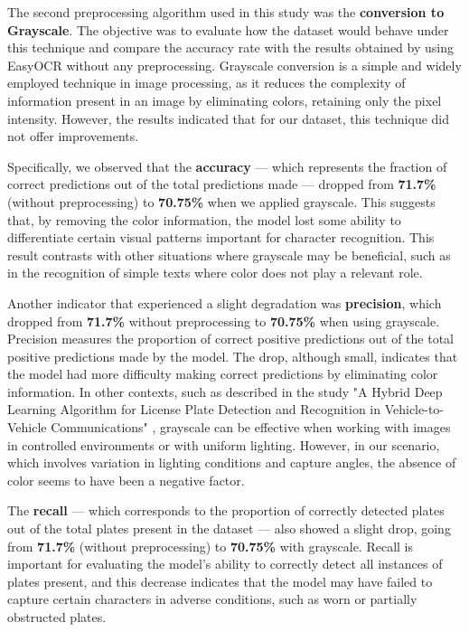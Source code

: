 \documentclass[conference]{IEEEtran}
\begin{document}
	The second preprocessing algorithm used in this study was the \textbf{conversion to Grayscale}. The objective was to evaluate how the dataset would behave under this technique and compare the accuracy rate with the results obtained by using EasyOCR without any preprocessing. Grayscale conversion is a simple and widely employed technique in image processing, as it reduces the complexity of information present in an image by eliminating colors, retaining only the pixel intensity. However, the results indicated that for our dataset, this technique did not offer improvements.
	
	Specifically, we observed that the \textbf{accuracy} — which represents the fraction of correct predictions out of the total predictions made — dropped from \textbf{71.7\%} (without preprocessing) to \textbf{70.75\%} when we applied grayscale. This suggests that, by removing the color information, the model lost some ability to differentiate certain visual patterns important for character recognition. This result contrasts with other situations where grayscale may be beneficial, such as in the recognition of simple texts where color does not play a relevant role.
	
	Another indicator that experienced a slight degradation was \textbf{precision}, which dropped from \textbf{71.7\%} without preprocessing to \textbf{70.75\%} when using grayscale. Precision measures the proportion of correct positive predictions out of the total positive predictions made by the model. The drop, although small, indicates that the model had more difficulty making correct predictions by eliminating color information. In other contexts, such as described in the study "A Hybrid Deep Learning Algorithm for License Plate Detection and Recognition in Vehicle-to-Vehicle Communications" \cite{b7}, grayscale can be effective when working with images in controlled environments or with uniform lighting. However, in our scenario, which involves variation in lighting conditions and capture angles, the absence of color seems to have been a negative factor.
	
	The \textbf{recall} — which corresponds to the proportion of correctly detected plates out of the total plates present in the dataset — also showed a slight drop, going from \textbf{71.7\%} (without preprocessing) to \textbf{70.75\%} with grayscale. Recall is important for evaluating the model's ability to correctly detect all instances of plates present, and this decrease indicates that the model may have failed to capture certain characters in adverse conditions, such as worn or partially obstructed plates.
	
\end{document}
